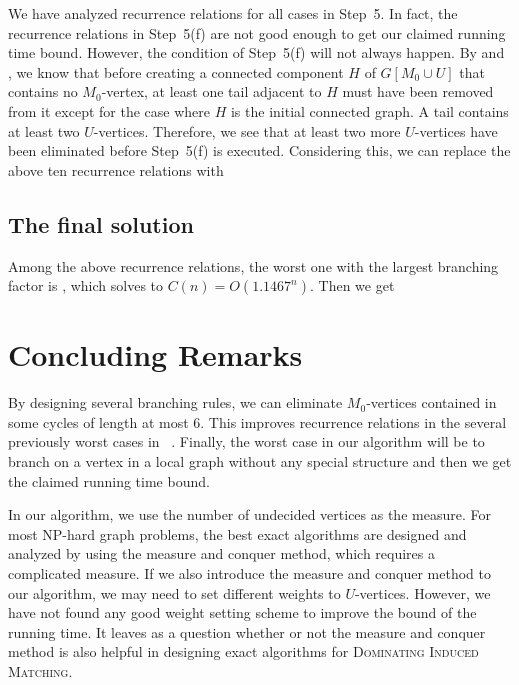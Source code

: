 \documentclass{elsart_TR2}
\begin{document}
We have analyzed recurrence relations for all cases in Step~5.
In fact, the  recurrence relations in Step~5(f)  are not good enough to get our claimed running time bound.
However, the condition of Step~5(f) will not always happen.
By  and , we know that before creating a connected component $H$ of $G[M_0\cup U]$ that contains no $M_0$-vertex,
at least one tail adjacent to $H$ must have been removed from it
 except for the case where $H$ is the initial connected graph.
A tail contains at least two $U$-vertices.
Therefore, we see that
at least two more $U$-vertices  have been eliminated before Step~5(f) is executed.
Considering this, we can replace the above ten recurrence relations with
  
     
   




\subsection{The final solution}

Among the above recurrence relations, the worst one with the largest branching factor is , which solves to $C(n)=O(1.1467^n)$. Then we get

\section{Concluding Remarks}\label{sec_con}
By designing several branching rules, we can eliminate $M_0$-vertices contained in some cycles of length at most 6.
This improves recurrence relations in the several previously worst cases in ~\cite{LMS:DIMexact}.
Finally, the worst case in our algorithm will be to branch on a vertex in a local graph
without any special structure and then we get the claimed running time bound.

In our algorithm, we use the number of undecided vertices as the measure.
For most NP-hard graph problems, the best exact algorithms are designed and analyzed by using the measure and conquer method,
which requires a complicated measure.
If we also introduce the measure and conquer method to our algorithm, we may need to set different weights to $U$-vertices.
However, we have not found any good weight setting scheme to improve the bound of the running time.
It leaves as a question whether or not the measure and conquer method is also helpful in designing exact algorithms for \textsc{Dominating Induced Matching}.
\end{document}
